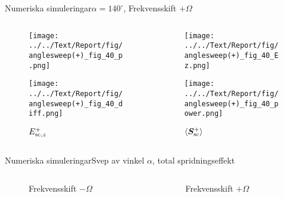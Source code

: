 \documentclass[11pt, final]{beamer}
\begin{document}
	\begin{frame}{Numeriska simuleringar}{$\alpha = 140^\circ$, Frekvensskift $+\Omega$}
		\begin{columns}
			\begin{column}{0.5\textwidth}
				\begin{figure}
					\centering
					\begin{overprint}
						\texttt{[image: ../../Text/Report/fig/anglesweep(+)\_fig\_40\_p.png]}
						\caption*{$p$}
						
						\texttt{[image: ../../Text/Report/fig/anglesweep(+)\_fig\_40\_diff.png]}
						\caption*{$E_{\mathrm{sc}, z}^+$}
					\end{overprint}
				\end{figure}
			\end{column}
			\begin{column}{0.5\textwidth}
				\begin{figure}
					\centering
					\begin{overprint}
						\onslide<1>
						\texttt{[image: ../../Text/Report/fig/anglesweep(+)\_fig\_40\_Ez.png]}
						\caption*{$E_{\mrm{i}, z}$}
						
						\onslide<2>
						\texttt{[image: ../../Text/Report/fig/anglesweep(+)\_fig\_40\_power.png]}
						\caption*{$\left< \bm{S}_{\mathrm{sc}}^+ \right>$}
					\end{overprint}
				\end{figure}
			\end{column}
		\end{columns}
	\end{frame}
	
	\begin{frame}{Numeriska simuleringar}{Svep av vinkel $\alpha$, total spridningseffekt}
		\begin{columns}
			\begin{column}{0.5\textwidth}
				\begin{figure}
					\centering
					\resizebox{\textwidth}{!}{}
					\caption*{Frekvensskift $-\Omega$}
				\end{figure}
			\end{column}
			\begin{column}{0.5\textwidth}
				\begin{figure}
					\centering
					\resizebox{\textwidth}{!}{}
					\caption*{Frekvensskift $+ \Omega$}
				\end{figure}
			\end{column}
		\end{columns}
	\end{frame}
		
\end{document}
